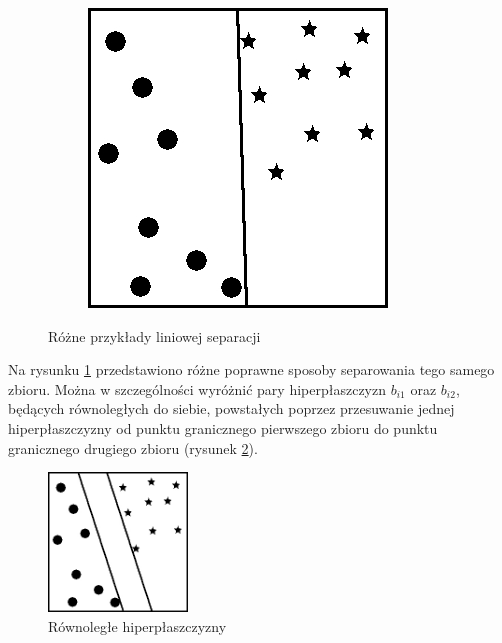 \begin{figure}[h!]
\begin{subfigure}[b]{0.33\textwidth}
    \end{subfigure}%
    \begin{subfigure}[b]{0.33\textwidth}
        \includegraphics[width=\linewidth]{img/granica_3.jpg}
    \end{subfigure}
    \caption{Różne przykłady liniowej separacji}
    \label{fig:liniowa_separacja}
\end{figure}

Na rysunku \ref{fig:liniowa_separacja} przedstawiono różne poprawne sposoby separowania tego samego zbioru. Można w szczególności wyróżnić pary hiperpłaszczyzn $b_{i1}$ oraz $b_{i2}$, będących równoległych do 
siebie, powstałych poprzez przesuwanie jednej hiperpłaszczyzny od punktu granicznego pierwszego zbioru do punktu granicznego drugiego zbioru (rysunek \ref{fig:rownolegla_separacja}).

\begin{figure}[h!]
    \centering
    \includegraphics[width=0.33\textwidth]{img/granica_rownolegla.jpg}
    \caption{Równoległe hiperpłaszczyzny}
    \label{fig:rownolegla_separacja}
\end{figure}

